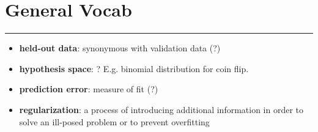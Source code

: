 \section{General Vocab}
\smallskip \hrule height 2pt \smallskip
 
 \begin{itemize}
 	\item \textbf{held-out data}: synonymous with validation data (?)
	\item \textbf{hypothesis space}: ?  E.g. binomial distribution for coin flip.  	
 	\item \textbf{prediction error}: measure of fit (?) 
	\item \textbf{regularization}: a process of introducing additional information in order to solve an ill-posed problem or to prevent overfitting  %
 \end{itemize}